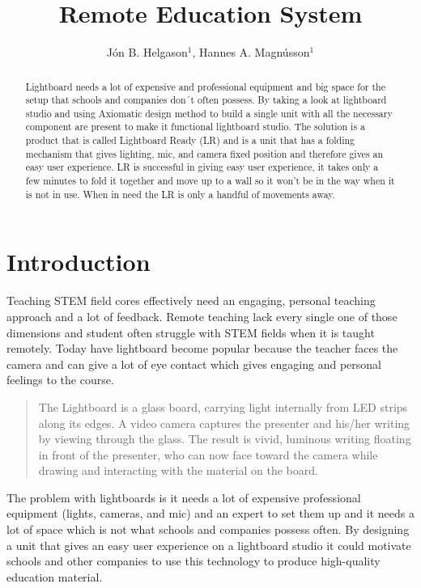 \documentclass[a4paper]{jpconf}
\begin{document}
\title{Remote Education System}

\author{ J\'on B. Helgason$^{1}$, Hannes A. Magnússon$^{1}$}

\address{$^{1}$Reykjavik University, Menntavegur 1, Reykjavik 102, Iceland}


\begin{abstract}
Lightboard needs a lot of expensive and professional equipment and big space for the setup that schools and companies don´t often possess.
By taking a look at lightboard studio and using Axiomatic design method to build a single unit with all the necessary component are present to make it functional lightboard studio.
The solution is a product that is called Lightboard Ready (LR) and is a unit that has a folding mechanism that gives lighting, mic, and camera fixed position and therefore gives an easy user experience.
LR is successful in giving easy user experience, it takes only a few minutes to fold it together and move up to a wall so it won't be in the way when it is not in use. When in need the LR is only a handful of movements away.
\end{abstract}



\section{Introduction}
Teaching STEM field cores effectively need an engaging, personal teaching approach and a lot of feedback. Remote teaching lack every single one of those dimensions and student often struggle with STEM fields when it is taught remotely. Today have lightboard become popular because the teacher faces the camera and can give a lot of eye contact which gives engaging and personal feelings to the course. 
\begin{quote}
	The Lightboard is a glass board, carrying light internally from LED strips along its edges. A video camera captures the presenter and his/her writing by viewing through the glass. The result is vivid, luminous writing floating in front of the presenter, who can now face toward the camera while drawing and interacting with the material on the board.\cite{birdwell2015capturing}
\end{quote}
The problem with lightboards is it needs a lot of expensive professional equipment (lights, cameras, and mic) and an expert to set them up and it needs a lot of space which is not what schools and companies possess often. 
By designing a unit that gives an easy user experience on a lightboard studio it could motivate schools and other companies to use this technology to produce high-quality education material.
\end{document}
